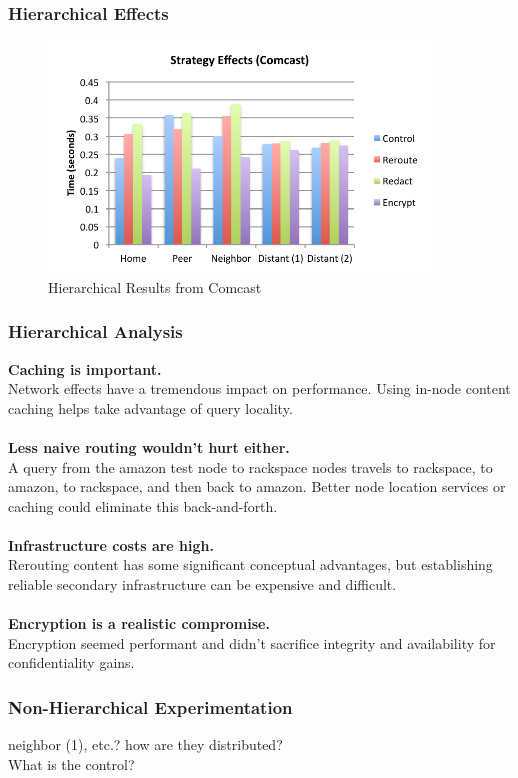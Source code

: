 \documentclass[t,handout]{beamer}
\begin{document}
\begin{frame}
\frametitle{Hierarchical Effects}
\begin{figure}[!t]
\centering
\includegraphics[width=4in]{strategy_effects_local}
\caption{Hierarchical Results from Comcast}
\end{figure}
\end{frame}

\begin{frame}
\frametitle{Hierarchical Analysis}
{\bf Caching is important.} \\
{\scriptsize Network effects have a tremendous impact on performance.  Using in-node content caching helps take advantage of query locality.} \\
~\\
{\bf Less naive routing wouldn't hurt either.} \\
{\scriptsize A query from the amazon test node to rackspace nodes travels to rackspace, to amazon, to rackspace, and then back to amazon.  Better node location services or caching could eliminate this back-and-forth.} \\
~\\
{\bf Infrastructure costs are high.} \\
{\scriptsize Rerouting content has some significant conceptual advantages, but establishing reliable secondary infrastructure can be expensive and difficult. } \\
~\\
{\bf Encryption is a realistic compromise.} \\
{\scriptsize Encryption seemed performant and didn't sacrifice integrity and availability for confidentiality gains.}
\end{frame}

\begin{frame}
\frametitle{Non-Hierarchical Experimentation}
neighbor (1), etc.? how are they distributed? \\
What is the control? \\
\end{frame}
\end{document}
